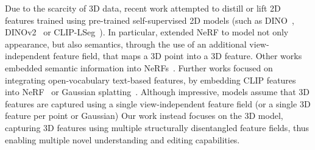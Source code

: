 Due to the scarcity of 3D data, recent work attempted to distill or lift 2D features trained using pre-trained self-supervised 2D models (such as DINO~\cite{caron2021emerging}, DINOv2~\cite{oquab2023dinov2} or CLIP-LSeg~\cite{li2022languagedriven}). In particular, \cite{kobayashi2022decomposing, tschernezki2022neural} extended NeRF to model not only appearance, but also semantics, through the use of an additional view-independent feature field, that maps a 3D point into a 3D feature. 
Other works embedded semantic information into NeRFs~\cite{siddiqui2023panoptic, yao2024matte}. Further works focused on integrating open-vocabulary text-based features, by embedding CLIP features into NeRF~\cite{kerr2023lerf} or Gaussian splatting~\cite{qin2023langsplat}. 
Although impressive, models assume that 3D features are captured using a single view-independent feature field (or a single 3D feature per point or Gaussian)
Our work instead focuses on the 3D model, capturing 3D features using multiple structurally disentangled feature fields, 
thus enabling multiple novel understanding and editing capabilities. 






